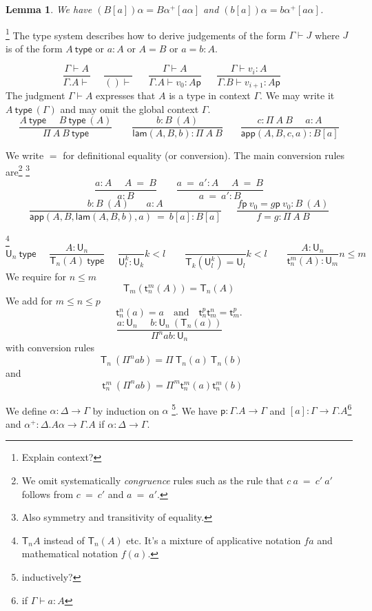 \documentclass[11pt,a4paper]{article}
\newtheorem{lemma}{Lemma}[theorem]
\theoremstyle{definition}
\newcommand{\conv}{=}
\def\UU{\mathsf{U}}
\newcommand{\type}{\mathsf{type}}
\newcommand{\LAM}{\mathsf{lam}}
\newcommand{\APP}{\mathsf{app}}
\newcommand{\T}{\mathsf{T}}
\newcommand{\sT}{\mathsf{t}}
\newcommand{\pp}{\mathsf{p}}
\begin{document}
\begin{lemma}
  We have $(B[a])\alpha = B\alpha^+[a\alpha]$ and $(b[a])\alpha = b\alpha^+[a\alpha]$.
\end{lemma}

\medskip
\footnote{Explain context?}
The type system describes how to derive judgements of the form $\Gamma\vdash J$ where $J$ is of the form
$A~\type$ or $a:A$ or $A=B$ or $a=b : A$.

\medskip

$$
\frac{\Gamma\vdash A}{\Gamma.A\vdash}~~~~~~\frac{}{()\vdash}~~~~~~~
\frac{\Gamma\vdash A}{\Gamma.A\vdash v_0:A\pp}~~~~~~~
\frac{\Gamma\vdash v_i:A}{\Gamma.B\vdash v_{i+1}:A\pp}~~~~~~~
$$
The judgment $\Gamma\vdash A$ expresses that $A$ is a type in context $\Gamma$.
We may write it $A~\type~(\Gamma)$ and may omit the global context $\Gamma$.
$$
\frac{A~\type~~~~~~B~\type~(A)}{\Pi~A~B~\type}~~~~~~~~~
\frac{b:B~(A)}{\LAM(A,B,b):\Pi~A~B}~~~~~~~~
\frac{c:\Pi~A~B~~~~~~a:A}
     {\APP(A,B,c,a):B[a]}
$$

We write $\conv$ for definitional equality (or conversion).
The main conversion rules are\footnote{We omit systematically {\em congruence} rules
  such as the rule that $c~a~\conv~c'~a'$ follows from $c~\conv~c'$ and $a~\conv~a'$.}
  \footnote{Also symmetry and transitivity of equality.}
$$
\frac{ a:A~~~~~~ A~ \conv~ B}{ a:B}~~~~~~~~~
\frac{ a ~\conv~a':A~~~~~~ A  ~\conv~ B}{ a ~\conv~a':B}
$$
$$
\frac{b:B~(A)~~~~~~~~ a:A}{ \APP(A,B,\LAM(A,B,b),a)  ~\conv~ b[a]:B[a]}
~~~~~~~
\frac{f\pp~v_0 = g\pp~v_0:B~(A)}{ f = g : \Pi~A~B}$$

\footnote{$\T_{n}A$ instead of $\T_{n}(A)$ etc. It's a mixture of applicative notation $fa$ and mathematical notation $f(a)$.}
$$
\UU_n~\type~~~~~~
\frac{A:\UU_{n}}{\T_{n}(A)~\type}~~~~~~
\frac{}{\UU^{k}_l:\UU_{k}}k<l~~~~~~~~~\frac{}{\T_{k}({\UU^{k}_l}) = \UU_{l}}k<l
~~~~~~~~~\frac{A:\UU_{n}}
{\sT_{n}^{m}(A):\UU_{m}}
n\leqslant m
$$
We require for $n\leqslant m$
\[
\T_m(\sT_{n}^{m}(A)) = \T_{n}(A) 
\]
We add for $m\leqslant n\leqslant p$
$$
\sT_{n}^n(a) = a \quad\text{and}\quad \sT_{n}^p\sT_{m}^n = \sT_m^p.
$$
$$
\frac{a:\UU_{n}~~~~~~b:\UU_n~(\T_{n}(a))}
     {\Pi^{n} a b:\UU_{n}}~~~~~~~~~
$$
with conversion rules
$$
\T_{n}~(\Pi^{n} a b) = \Pi~{\T_{n}(a)}~{\T_{n}(b)}~~~~~~~
$$
and
$$
\sT_{n}^{m}~(\Pi^{n} a b) = \Pi^{m} \sT_{n}^{m}(a) \sT_{n}^{m}(b)~~~~~~
$$

 We define $\alpha:\Delta\rightarrow\Gamma$ by induction on $\alpha$
 \footnote{inductively?}.
We have $\pp:\Gamma.A\rightarrow\Gamma$ and $[a]:\Gamma\rightarrow \Gamma.A$\footnote{if $\Gamma \vdash a : A$} and
$\alpha^+:\Delta.A\alpha\rightarrow\Gamma.A$ if $\alpha:\Delta\rightarrow\Gamma$.
\end{document}
